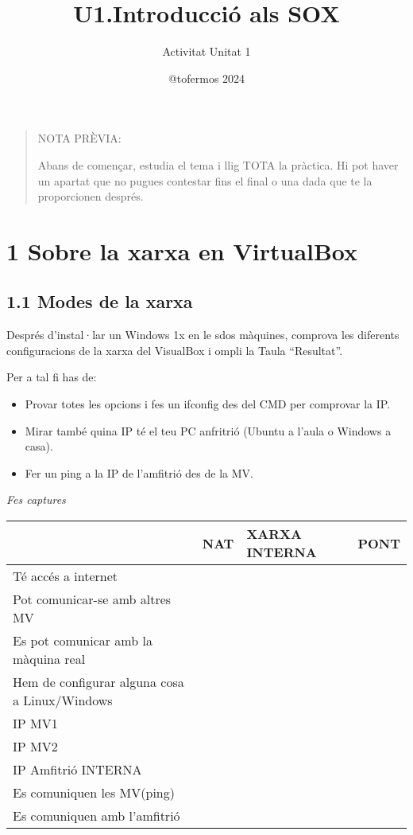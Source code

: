 \documentclass[
  a4paper,
]{article}
\title{U1.Introducció als SOX}
\subtitle{Activitat Unitat 1}
\author{@tofermos 2024}
\date{}
\providecommand{\tightlist}{%
  \setlength{\itemsep}{0pt}\setlength{\parskip}{0pt}}
\begin{document}
\maketitle

{
\setcounter{tocdepth}{2}
\tableofcontents
}
\newpage
\renewcommand\tablename{Tabla}

\begin{quote}
NOTA PRÈVIA:

Abans de començar, estudia el tema i llig TOTA la pràctica. Hi pot haver
un apartat que no pugues contestar fins el final o una dada que te la
proporcionen després.
\end{quote}

\section{1 Sobre la xarxa en
VirtualBox}\label{sobre-la-xarxa-en-virtualbox}

\subsection{1.1 Modes de la xarxa}\label{modes-de-la-xarxa}

Després d'instal·lar un Windows 1x en le sdos màquines, comprova les
diferents configuracions de la xarxa del VisualBox i ompli la Taula
``Resultat''.

Per a tal fi has de:

\begin{itemize}
\tightlist
\item
  Provar totes les opcions i fes un ifconfig des del CMD per comprovar
  la IP.
\item
  Mirar també quina IP té el teu PC anfritrió (Ubuntu a l'aula o Windows
  a casa).
\item
  Fer un ping a la IP de l'amfitrió des de la MV.
\end{itemize}

\emph{Fes captures}

\begin{longtable}[]{@{}llll@{}}
\toprule\noalign{}
& NAT & XARXA INTERNA & PONT \\
\midrule\noalign{}
\endhead
\bottomrule\noalign{}
\endlastfoot
Té accés a internet & & & \\
Pot comunicar-se amb altres MV & & & \\
Es pot comunicar amb la màquina real & & & \\
Hem de configurar alguna cosa a Linux/Windows & & & \\
IP MV1 & & & \\
IP MV2 & & & \\
IP Amfitrió INTERNA & & & \\
Es comuniquen les MV(ping) & & & \\
Es comuniquen amb l'amfitrió & & & \\
\end{longtable}
\end{document}
